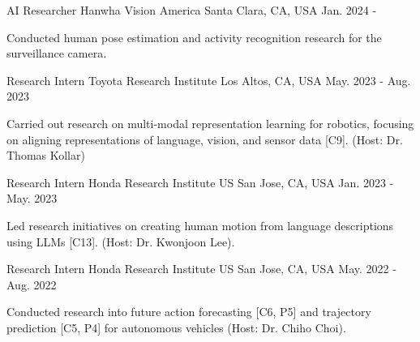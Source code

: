 


\begin{cventries}
\cventry
{AI Researcher} %
{Hanwha Vision America} %
{Santa Clara, CA, USA} %
{Jan. 2024 - } %
{ %
\begin{cvitems}
    \item {Conducted human pose estimation and activity recognition research for the surveillance camera.}
\end{cvitems}
}
\vspace{-.5em}


\cventry
{Research Intern} %
{Toyota Research Institute} %
{Los Altos, CA, USA} %
{May. 2023 - Aug. 2023} %
{ %
\begin{cvitems}
    \item {Carried out research on multi-modal representation learning for robotics, focusing on aligning representations of language, vision, and sensor data [C9]. (Host: Dr. Thomas Kollar)}
\end{cvitems}
}
\vspace{-.5em}


\cventry
{Research Intern} %
{Honda Research Institute US} %
{San Jose, CA, USA} %
{Jan. 2023 - May. 2023} %
{ %
\begin{cvitems}
\item {Led research initiatives on creating human motion from language descriptions using LLMs [C13]. (Host: Dr. Kwonjoon Lee).}
\end{cvitems}
}
\vspace{-.5em}

\cventry
{Research Intern} %
{Honda Research Institute US} %
{San Jose, CA, USA} %
{May. 2022 - Aug. 2022} %
{ %
\begin{cvitems}
\item {Conducted research into future action forecasting [C6, P5] and trajectory prediction [C5, P4] for autonomous vehicles (Host: Dr. Chiho Choi).}
\end{cvitems}
}
\vspace{-.5em}


\end{cventries}
